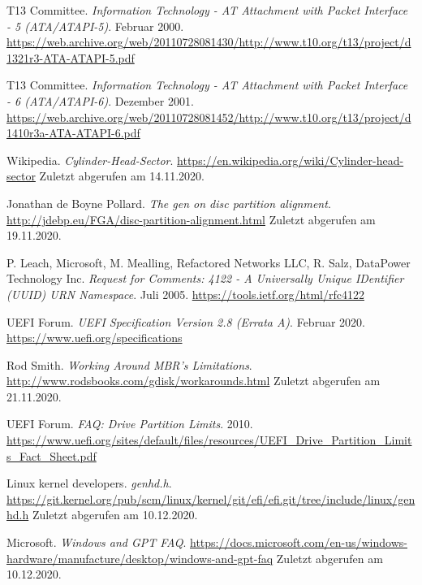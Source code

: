 \begin{thebibliography}{99}
        T13 Committee.
        \textit{Information Technology - AT Attachment with Packet Interface - 5 (ATA/ATAPI-5)}.
        Februar 2000.
        \url{https://web.archive.org/web/20110728081430/http://www.t10.org/t13/project/d1321r3-ATA-ATAPI-5.pdf}

        T13 Committee.
        \textit{Information Technology - AT Attachment with Packet Interface - 6 (ATA/ATAPI-6)}.
        Dezember 2001.
        \url{https://web.archive.org/web/20110728081452/http://www.t10.org/t13/project/d1410r3a-ATA-ATAPI-6.pdf}

        Wikipedia.
        \textit{Cylinder-Head-Sector}.
        \url{https://en.wikipedia.org/wiki/Cylinder-head-sector}
        Zuletzt abgerufen am 14.11.2020.

        Jonathan de Boyne Pollard.
        \textit{The gen on disc partition alignment}.
        \url{http://jdebp.eu/FGA/disc-partition-alignment.html}
        Zuletzt abgerufen am 19.11.2020.

        P. Leach, Microsoft, M. Mealling, Refactored Networks LLC, R. Salz, DataPower Technology Inc.
        \textit{Request for Comments: 4122 - A Universally Unique IDentifier (UUID) URN Namespace}.
        Juli 2005.
        \url{https://tools.ietf.org/html/rfc4122}

        UEFI Forum.
        \textit{UEFI Specification Version 2.8 (Errata A)}.
        Februar 2020.
        \url{https://www.uefi.org/specifications}

        Rod Smith.
        \textit{Working Around MBR's Limitations}.
        \url{http://www.rodsbooks.com/gdisk/workarounds.html}
        Zuletzt abgerufen am 21.11.2020.

        UEFI Forum.
        \textit{FAQ: Drive Partition Limits}.
        2010.
        \url{https://www.uefi.org/sites/default/files/resources/UEFI_Drive_Partition_Limits_Fact_Sheet.pdf}


        Linux kernel developers.
        \textit{genhd.h}.
        \url{https://git.kernel.org/pub/scm/linux/kernel/git/efi/efi.git/tree/include/linux/genhd.h}
        Zuletzt abgerufen am 10.12.2020.

        Microsoft.
        \textit{Windows and GPT FAQ}.
        \url{https://docs.microsoft.com/en-us/windows-hardware/manufacture/desktop/windows-and-gpt-faq}
        Zuletzt abgerufen am 10.12.2020.


\end{thebibliography}
